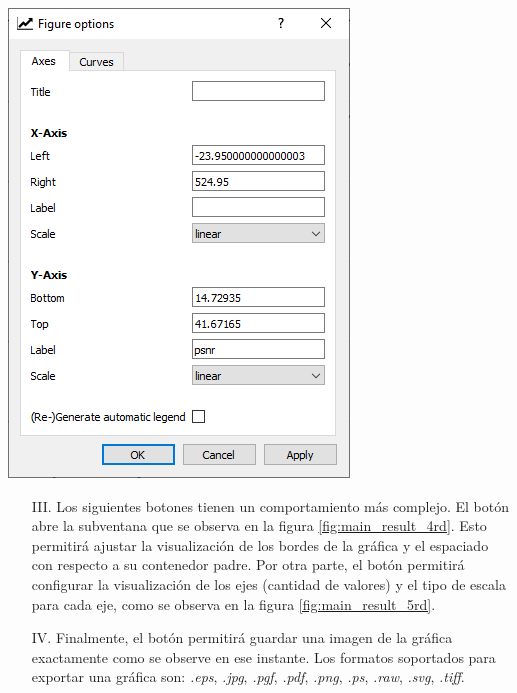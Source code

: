 \documentclass[12pt,twoside,letter]{ol-softwaremanual}
\newenvironment{Figure}
  {\par\medskip\noindent\minipage{\linewidth}}
  {\endminipage\par\medskip}
\begin{document}
\begin{multicols}{2}
	
	\begin{Figure}
		\centering
		\includegraphics[width=0.7\linewidth]{main-result-5.png}
		\label{fig:main_result_5rd}
	\end{Figure}
	
	\vfill\null
	\columnbreak
	
	\begin{itemize}
		\setlength\itemsep{0em}
		
		\item[III.] Los siguientes botones tienen un comportamiento más complejo. El botón \hspace{0.5mm} \faBars \hspace{0.5mm} abre la subventana que se observa en la figura \ref{fig:main_result_4rd}. Esto permitirá ajustar la visualización de los bordes de la gráfica y el espaciado con respecto a su contenedor padre. Por otra parte, el botón \hspace{0.5mm} \faLineChart \hspace{0.5mm} permitirá configurar la visualización de los ejes (cantidad de valores) y el tipo de escala para cada eje, como se observa en la figura \ref{fig:main_result_5rd}.
		
		\item[IV.] Finalmente, el botón \hspace{0.5mm} \faSave \hspace{0.5mm} permitirá guardar una imagen de la gráfica exactamente como se observe en ese instante. Los formatos soportados para exportar una gráfica son: \textit{.eps}, \textit{.jpg}, \textit{.pgf}, \textit{.pdf}, \textit{.png}, \textit{.ps}, \textit{.raw}, \textit{.svg}, \textit{.tiff}.
	\end{itemize}
	
\end{multicols}
\end{document}

